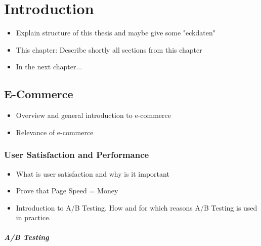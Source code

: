 \chapter{Introduction}

\begin{itemize}
	\item Explain structure of this thesis and maybe give some "eckdaten"
	\item This chapter: Describe shortly all sections from this chapter
	\item In the next chapter...
\end{itemize}




\section{E-Commerce}

\begin{itemize}
\item Overview and general introduction to e-commerce
\item Relevance of e-commerce
\end{itemize}




\subsection{User Satisfaction and Performance}

\begin{itemize}
\item What is user satisfaction and why is it important
\item Prove that Page Speed = Money
\item Introduction to A/B Testing. How and for which reasons A/B Testing is used in practice.
\end{itemize}





\paragraph{A/B Testing}

